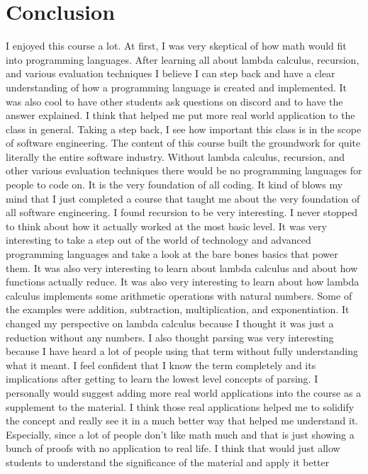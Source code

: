 \documentclass{article}
\theoremstyle{plain}
\theoremstyle{definition}
\theoremstyle{remark}
\begin{document}
\section{Conclusion}\label{conclusion}

I enjoyed this course a lot. At first, I was very skeptical of how math would fit into programming languages. After learning all about lambda calculus, recursion, and various evaluation techniques I believe I can step back and have a clear understanding of how a programming language is created and implemented. It was also cool to have other students ask questions on discord and to have the answer explained. I think that helped me put more real world application to the class in general. Taking a step back, I see how important this class is in the scope of software engineering. The content of this course built the groundwork for quite literally the entire software industry. Without lambda calculus, recursion, and other various evaluation techniques there would be no programming languages for people to code on. It is the very foundation of all coding. It kind of blows my mind that I just completed a course that taught me about the very foundation of all software engineering. I found recursion to be very interesting. I never stopped to think about how it actually worked at the most basic level. It was very interesting to take a step out of the world of technology and advanced programming languages and take a look at the bare bones basics that power them. It was also very interesting to learn about lambda calculus and about how functions actually reduce. It was also very interesting to learn about how lambda calculus implements some arithmetic operations with natural numbers. Some of the examples were addition, subtraction, multiplication, and exponentiation. It changed my perspective on lambda calculus because I thought it was just a reduction without any numbers. I also thought parsing was very interesting because I have heard a lot of people using that term without fully understanding what it meant. I feel confident that I know the term completely and its implications after getting to learn the lowest level concepts of parsing. I personally would suggest adding more real world applications into the course as a supplement to the material. I think those real applications helped me to solidify the concept and really see it in a much better way that helped me understand it. Especially, since a lot of people don't like math much and that is just showing a bunch of proofs with no application to real life. I think that would just allow students to understand the significance of the material and apply it better
\end{document}
